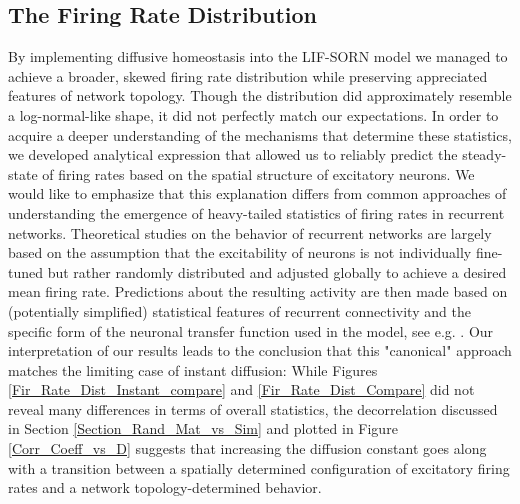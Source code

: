 \documentclass[10pt,a4paper]{article}
\begin{document}
\subsection{The Firing Rate Distribution} \label{Fir_Rate_Dist_Discussion_Section}
By implementing diffusive homeostasis into the LIF-SORN model we managed to achieve a broader, skewed firing rate distribution while preserving appreciated features of network topology. Though the distribution did approximately resemble a log-normal-like shape, it did not perfectly match our expectations. In order to acquire a deeper understanding of the mechanisms that determine these statistics, we developed analytical expression that allowed us to reliably predict the steady-state of firing rates based on the spatial structure of excitatory neurons. We would like to emphasize that this explanation differs from common approaches of understanding the emergence of heavy-tailed statistics of firing rates in recurrent networks. Theoretical studies on the behavior of recurrent networks are largely based on the assumption that the excitability of neurons is not individually fine-tuned but rather randomly distributed and adjusted globally to achieve a desired mean firing rate. Predictions about the resulting activity are then made based on (potentially simplified) statistical features of recurrent connectivity and the specific form of the neuronal transfer function used in the model, see e.g. \cite{Roxin_Firing_Rate_Distribution,Vreeswijk1998}. Our interpretation of our results leads to the conclusion that this "canonical" approach matches the limiting case of instant diffusion: While Figures \ref{Fir_Rate_Dist_Instant_compare} and \ref{Fir_Rate_Dist_Compare} did not reveal many differences in terms of overall statistics, the decorrelation discussed in Section \ref{Section_Rand_Mat_vs_Sim} and plotted in Figure \ref{Corr_Coeff_vs_D} suggests that increasing the diffusion constant goes along with a transition between a spatially determined configuration of excitatory firing rates and a network topology-determined behavior.
\end{document}
